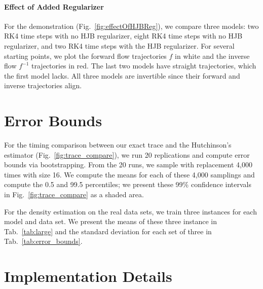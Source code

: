 \documentclass[letterpaper]{article}
\begin{document}
	\paragraph{Effect of Added Regularizer}
	
	For the demonstration (Fig.~\ref{fig:effectOfHJBReg}), we compare three models: two RK4 time steps with no HJB regularizer, eight RK4 time steps with no HJB regularizer, and two RK4 time steps with the HJB regularizer. For several starting points, we plot the forward flow trajectories $f$ in white and the inverse flow $f^{-1}$ trajectories in red. The last two models have straight trajectories, which the first model lacks. All three models are invertible since their forward and inverse trajectories align.

\section{Error Bounds}
\label{app:errors}

	For the timing comparison between our exact trace and the Hutchinson's estimator (Fig.~\ref{fig:trace_compare}), we run 20 replications and compute error bounds via bootstrapping. From the 20 runs, we sample with replacement 4,000 times with size 16. We compute the means for each of these 4,000 samplings and compute the 0.5 and 99.5 percentiles; we present these 99\% confidence intervals in Fig.~\ref{fig:trace_compare} as a shaded area.
	
	For the density estimation on the real data sets, we train three instances for each model and data set. We present the means of these three instance in Tab.~\ref{tab:large} and the standard deviation for each set of three in Tab.~\ref{tab:error_bounds}.



\section{Implementation Details}
\label{app:implementation}
\end{document}
